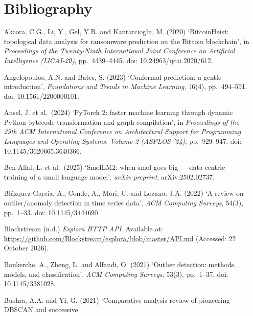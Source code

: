 \clearpage
\section*{Bibliography}

\begin{references}
\item Akcora, C.G., Li, Y., Gel, Y.R. and Kantarcioglu, M. (2020) `BitcoinHeist: topological data analysis for
  ransomware prediction on the Bitcoin blockchain', in \emph{Proceedings of the Twenty-Ninth International Joint
  Conference on Artificial Intelligence (IJCAI-20)}, pp.\ 4439--4445. doi: 10.24963/ijcai.2020/612.
\item Angelopoulos, A.N. and Bates, S. (2023) `Conformal prediction: a gentle introduction', \emph{Foundations and
  Trends in Machine Learning}, 16(4), pp.\ 494--591. doi: 10.1561/2200000101.
\item Ansel, J. et al.\ (2024) `PyTorch 2: faster machine learning through dynamic Python bytecode transformation
  and graph compilation', in \emph{Proceedings of the 29th ACM International Conference on Architectural Support
  for Programming Languages and Operating Systems, Volume 2 (ASPLOS '24)}, pp.\ 929--947.
  doi: 10.1145/3620665.3640366.
\item Ben Allal, L. et al.\ (2025) `SmolLM2: when smol goes big --- data-centric training of a small language
  model', \emph{arXiv preprint}, arXiv:2502.02737.
\item Blázquez-García, A., Conde, A., Mori, U. and Lozano, J.A. (2022) `A review on outlier/anomaly detection in
  time series data', \emph{ACM Computing Surveys}, 54(3), pp.\ 1--33. doi: 10.1145/3444690.
\item Blockstream (n.d.) \emph{Esplora HTTP API}. Available at:
  \url{https://github.com/Blockstream/esplora/blob/master/API.md} (Accessed: 22 October 2026).
\item Boukerche, A., Zheng, L. and Alfandi, O. (2021) `Outlier detection: methods, models, and classification',
  \emph{ACM Computing Surveys}, 53(3), pp.\ 1--37. doi: 10.1145/3381028.
\item Bushra, A.A. and Yi, G. (2021) `Comparative analysis review of pioneering DBSCAN and successive

\end{references}
